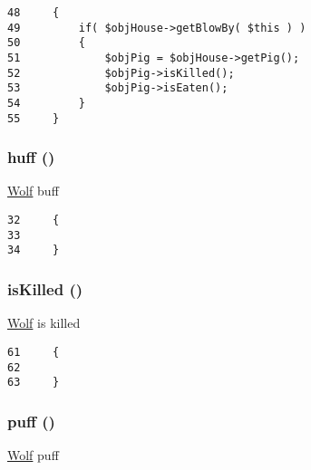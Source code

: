 \begin{Code}\begin{verbatim}48     {
49         if( $objHouse->getBlowBy( $this ) )
50         {
51             $objPig = $objHouse->getPig();
52             $objPig->isKilled();
53             $objPig->isEaten();
54         }
55     }
\end{verbatim}
\end{Code}


\hypertarget{class_wolf_5f459b17559a1eca24d746db4f77fac0}{
\subsubsection[{huff}]{\setlength{\rightskip}{0pt plus 5cm}huff ()}}
\label{class_wolf_5f459b17559a1eca24d746db4f77fac0}


\hyperlink{class_wolf}{Wolf} buff 

\begin{Code}\begin{verbatim}32     {
33 
34     }
\end{verbatim}
\end{Code}


\hypertarget{class_wolf_ec29070d2544b3cfe0447dcbc5e6c199}{
\subsubsection[{isKilled}]{\setlength{\rightskip}{0pt plus 5cm}isKilled ()}}
\label{class_wolf_ec29070d2544b3cfe0447dcbc5e6c199}


\hyperlink{class_wolf}{Wolf} is killed 

\begin{Code}\begin{verbatim}61     {
62         
63     }
\end{verbatim}
\end{Code}


\hypertarget{class_wolf_b5eff6bb92e5551d9188160b85e5cc19}{
\subsubsection[{puff}]{\setlength{\rightskip}{0pt plus 5cm}puff ()}}
\label{class_wolf_b5eff6bb92e5551d9188160b85e5cc19}


\hyperlink{class_wolf}{Wolf} puff 

